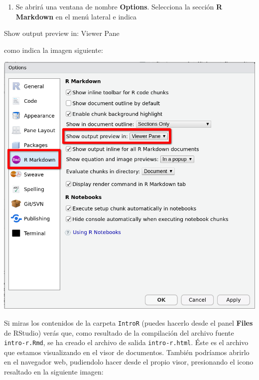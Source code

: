 \documentclass[
  degree=mecinf,
  title=normal,
  toc=normal,
  bib=normal]{mnye}
\providecommand{\tightlist}{%
  \setlength{\itemsep}{0pt}\setlength{\parskip}{0pt}}
\begin{document}
\begin{enumerate}
\def\labelenumi{\arabic{enumi}.}
\setcounter{enumi}{1}
\tightlist
\item
  Se abrirá una ventana de nombre \textbf{Options}. Selecciona la sección \textbf{R Markdown} en el menú lateral e indica
\end{enumerate}

\begin{menu}
Show output preview in: Viewer Pane

\end{menu}

como indica la imagen siguiente:

\begin{center}\includegraphics[width=1\linewidth]{images/options-r-markdown} \end{center}

Si miras los contenidos de la carpeta \texttt{IntroR} (puedes hacerlo desde el panel \textbf{Files} de \textsf{RStudio}) verás que, como resultado de la compilación del archivo fuente \texttt{intro-r.Rmd}, se ha creado el archivo de salida \texttt{intro-r.html}. Éste es el archivo que estamos visualizando en el visor de documentos. También podríamos abrirlo en el navegador web, pudiendolo hacer desde el propio visor, presionando el icono resaltado en la siguiente imagen:
\end{document}
